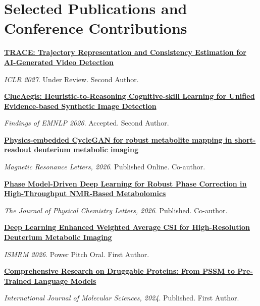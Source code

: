 \documentclass[10pt,letterpaper]{article}
\begin{document}
\section{Selected Publications and Conference Contributions}
\begin{minipage}{\linewidth}
\small\textbf{\href{https://openreview.net/forum?id=erYE1VciKv}{TRACE: Trajectory Representation and Consistency Estimation for AI-Generated Video Detection}}\par
\textit{ICLR 2027}. Under Review. Second Author.\end{minipage}\par\vspace{5pt}
\begin{minipage}{\linewidth}
\small\textbf{\href{https://openreview.net/forum?id=Hxm5eSFUT9}{ClueAegis: Heuristic-to-Reasoning Cognitive-skill Learning for Unified Evidence-based Synthetic Image Detection}}\par
\textit{Findings of EMNLP 2026}. Accepted. Second Author.\end{minipage}\par\vspace{5pt}
\begin{minipage}{\linewidth}
\small\textbf{\href{https://doi.org/10.1016/j.mrl.2026.200272}{Physics-embedded CycleGAN for robust metabolite mapping in short-readout deuterium metabolic imaging}}\par
\textit{Magnetic Resonance Letters, 2026}. Published Online. Co-author.\end{minipage}\par\vspace{5pt}
\begin{minipage}{\linewidth}
\small\textbf{\href{https://doi.org/10.1021/acs.jpclett.5c03529}{Phase Model-Driven Deep Learning for Robust Phase Correction in High-Throughput NMR-Based Metabolomics}}\par
\textit{The Journal of Physical Chemistry Letters, 2026}. Published. Co-author.\end{minipage}\par\vspace{5pt}
\begin{minipage}{\linewidth}
\small\textbf{\href{https://echo.ismrm.org/program/ISMRM2026/at-a-glance/session/616}{Deep Learning Enhanced Weighted Average CSI for High-Resolution Deuterium Metabolic Imaging}}\par
\textit{ISMRM 2026}. Power Pitch Oral. First Author.\end{minipage}\par\vspace{5pt}
\begin{minipage}{\linewidth}
\small\textbf{\href{https://doi.org/10.3390/ijms25084507}{Comprehensive Research on Druggable Proteins: From PSSM to Pre-Trained Language Models}}\par
\textit{International Journal of Molecular Sciences, 2024}. Published. First Author.\end{minipage}\par\vspace{5pt}
\end{document}
